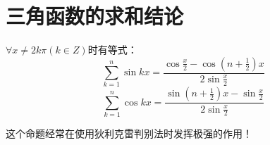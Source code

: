 \section{三角函数的求和结论}

\begin{proposition}
	$\forall x\neq 2k\pi(k\in Z)$时有等式：
	\begin{equation}
		\displaystyle\sum_{k=1}^{n}\sin{kx}=\dfrac{\cos{\frac{x}{2}-\cos{(n+\frac{1}{2})}x}}{2\sin{\frac{x}{2}}}
	\end{equation}
	\begin{equation}
		\displaystyle\sum_{k=1}^{n}\cos{kx}=\dfrac{{\sin{(n+\frac{1}{2})}x-\sin{\frac{x}{2}}}}{2\sin{\frac{x}{2}}}		
	\end{equation}	
\end{proposition}

这个命题经常在使用狄利克雷判别法时发挥极强的作用！